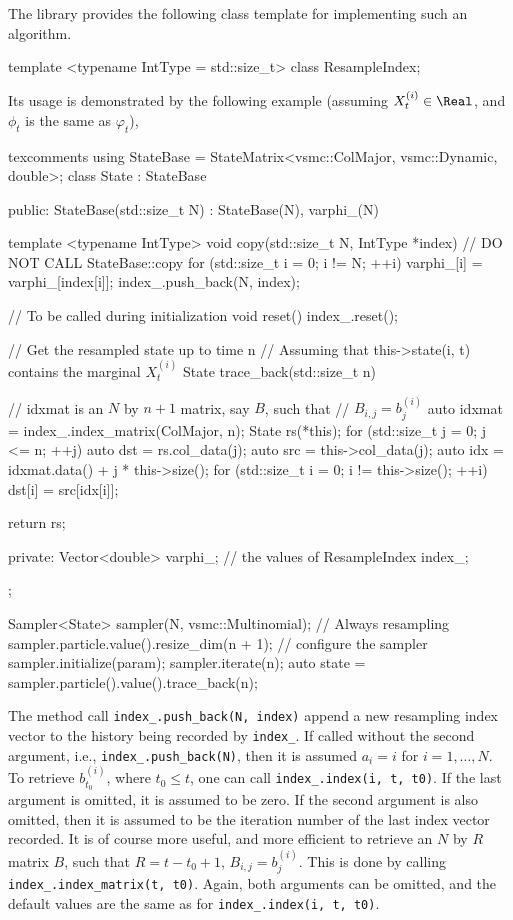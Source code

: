 The library provides the following class template for implementing such an
algorithm.
\begin{cppcode}
template <typename IntType = std::size_t>
class ResampleIndex;
\end{cppcode}
Its usage is demonstrated by the following example (assuming
$X_t^{(i)}\in\Real$, and $\phi_t$ is the same as $\varphi_t$),
\begin{cppcode*}{texcomments}
  using StateBase = StateMatrix<vsmc::ColMajor, vsmc::Dynamic, double>;
  class State : StateBase
  {
      public:
      StateBase(std::size_t N) : StateBase(N), varphi_(N) {}

      template <typename IntType>
      void copy(std::size_t N, IntType *index)
      {
          // DO NOT CALL StateBase::copy
          for (std::size_t i = 0; i != N; ++i)
              varphi_[i] = varphi_[index[i]];
          index_.push_back(N, index);
      }

      // To be called during initialization
      void reset() { index_.reset(); }

      // Get the resampled state up to time n
      // Assuming that this->state(i, t) contains the marginal $X_t^{(i)}$
      State trace_back(std::size_t n)
      {
          // idxmat is an $N$ by $n + 1$ matrix, say $B$, such that
          // $B_{i,j} = b_j^{(i)}$
          auto idxmat = index_.index_matrix(ColMajor, n);
          State rs(*this);
          for (std::size_t j = 0; j <= n; ++j) {
              auto dst = rs.col_data(j);
              auto src = this->col_data(j);
              auto idx = idxmat.data() + j * this->size();
              for (std::size_t i = 0; i != this->size(); ++i)
                  dst[i] = src[idx[i]];
          }

          return rs;
      }

      private:
      Vector<double> varphi_; // the values of 
      ResampleIndex index_;
  };

  Sampler<State> sampler(N, vsmc::Multinomial); // Always resampling
  sampler.particle.value().resize_dim(n + 1);
  // configure the sampler
  sampler.initialize(param);
  sampler.iterate(n);
  auto state = sampler.particle().value().trace_back(n);
\end{cppcode*}
The method call \verb|index_.push_back(N, index)| append a new resampling index
vector to the history being recorded by \verb|index_|. If called without the
second argument, i.e., \verb|index_.push_back(N)|, then it is assumed $a_i = i$
for $i = 1,\dots,N$. To retrieve $b_{t_0}^{(i)}$, where $t_0 \le t$, one can
call \verb|index_.index(i, t, t0)|. If the last argument is omitted, it is
assumed to be zero. If the second argument is also omitted, then it is assumed
to be the iteration number of the last index vector recorded. It is of course
more useful, and more efficient to retrieve an $N$ by $R$ matrix $B$, such that
$R = t - t_0 + 1$, $B_{i,j} = b_j^{(i)}$. This is done by calling
\verb|index_.index_matrix(t, t0)|. Again, both arguments can be omitted, and
the default values are the same as for \verb|index_.index(i, t, t0)|.

